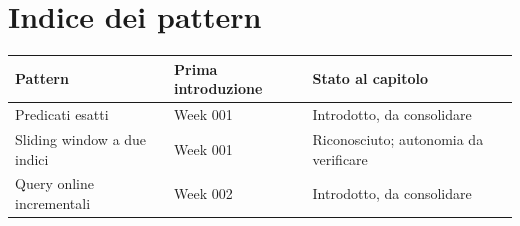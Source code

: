 \documentclass[11pt,a4paper,openany]{book}
\begin{document}
\tableofcontents

\mainmatter



\backmatter
\chapter*{Indice dei pattern}

\begin{tabular}{@{}p{}p{}p{}@{}}
\toprule
Pattern & Prima introduzione & Stato al capitolo \\
\midrule
Predicati esatti & Week 001 & Introdotto, da consolidare \\
Sliding window a due indici & Week 001 & Riconosciuto; autonomia da verificare \\
Query online incrementali & Week 002 & Introdotto, da consolidare \\
\bottomrule
\end{tabular}
\end{document}

